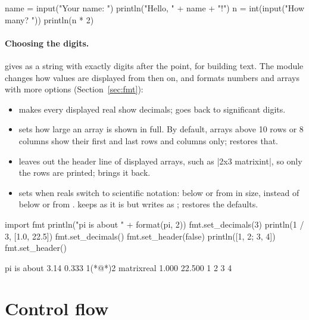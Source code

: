 \documentclass[11pt,a4paper,openany]{report}
\begin{document}
{{\begin{axon}
name = input("Your name: ")
println("Hello, " + name + "!")
n = int(input("How many? "))
println(n * 2)
\end{axon}

\paragraph{Choosing the digits.}  gives  as a string
with exactly  digits after the point, for building text. The
 module changes how values are displayed from then on, and formats
numbers and arrays with more options (Section~\ref{sec:fmt}):

\begin{itemize}
\item {} makes every displayed real show 
  decimals;  goes back to significant digits.
\item {} sets how large an array is shown in full.
  By default, arrays above 10 rows or 8 columns show their first and last rows
  and columns only;  restores that.
\item {} leaves out the header line of displayed
  arrays, such as \code|2x3 matrix{int}|, so only the rows are
  printed;  brings it back.
\item {} sets when reals switch to scientific
  notation: below  or from  in size, instead of below
   or from .  keeps
   as it is but writes  as ;
   restores the defaults.
\end{itemize}

\begin{axon}
import fmt
println("pi is about " + format(pi, 2))
fmt.set_decimals(3)
println(1 / 3, [1.0, 22.5])
fmt.set_decimals()
fmt.set_header(false)
println([1, 2; 3, 4])
fmt.set_header()
\end{axon}
\begin{axonout}
pi is about 3.14
0.333 1(*@\texttimes@*)2 matrix{real}
  1.000  22.500
1  2
3  4
\end{axonout}

\section{Control flow}

}}
\end{document}
